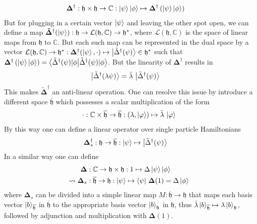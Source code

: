 \begin{align*}
    \mathbf{\Delta}^\dagger &: \mathfrak{h}\times\mathfrak{h}\to\mathbb{C}: \ket{\psi}\ket{\phi}\mapsto \mathbf{\Delta}^\dagger\left(\ket{\psi}\ket{\phi}\right)
\end{align*}
But for plugging in a certain vector $\ket{\psi}$ and leaving the other spot open, we can define a map $\mathbf{\tilde{\Delta}}^\dagger(\ket{\psi}):\mathfrak{h}\to\mathcal{L}(\mathfrak{h},\mathbb{C})\to\mathfrak{h}^*$, where $\mathcal{L}(\mathfrak{h},\mathbb{C})$ is the space of linear maps from $\mathfrak{h}$ to $\mathbb{C}$. But each such map can be represented in the dual space by a vector $\mathcal{L}(\mathfrak{h},\mathbb{C})\to \mathfrak{h}^*:\mathbf{\Delta}^\dagger(\ket{\psi},\cdot)\mapsto\ket{\tilde{\Delta}^\dagger(\psi)}\in\mathfrak{h}^*$ such that $\mathbf{\Delta}^\dagger\left(\ket{\psi}\ket{\phi}\right) = \braket{\tilde{\Delta}^\dagger(\psi)|\phi}$. But the linearity of $\mathbf{\Delta}^\dagger$ results in 
\begin{align*}
    \ket{\tilde{\Delta}^\dagger(\lambda\psi)} &= \bar{\lambda}\,\ket{\tilde{\Delta}^\dagger(\psi)}
\end{align*}
This makes $\mathbf{\tilde{\Delta}}^\dagger$ an anti-linear operation. One can resolve this issue by introduce a different space $\overline{\mathfrak{h}}$ which possesses a scalar multiplication of the form
$$\cdot: \mathbb{C}\times\overline{\mathfrak{h}}\to\overline{\mathfrak{h}}: (\lambda,\ket{\varphi})\mapsto \bar{\lambda}\,\ket{\varphi}$$
By this way one can define a linear operator over single particle Hamiltonians
\begin{align*}
    \mathbf{\Delta}_s^\dagger &: \mathfrak{h}\to\overline{\mathfrak{h}}: \ket{\psi}\mapsto \ket{\tilde{\Delta}^\dagger(\psi)}
\end{align*}
In a similar way one can define
\begin{align*}
    \mathbf{\Delta} &:\mathbb{C}\to \mathfrak{h}\times\mathfrak{h}: 1\mapsto\Delta \ket{\psi}\ket{\phi}\\
    \leadsto\mathbf{\Delta}_s &: \overline{\mathfrak{h}}\to\mathfrak{h}: \ket{\psi}\mapsto \bra{\psi}\,\mathbf{\Delta}(1)=\Delta\ket{\phi}
\end{align*}
where $\mathbf{\Delta}_s$ can be divided into a simple linear map $M:\overline{\mathfrak{h}}\to\mathfrak{h}$ that maps each basis vector $\ket{b}_{\overline{\mathfrak{h}}}$ in $\overline{\mathfrak{h}}$ to the appropriate basis vector $\ket{b}_{\mathfrak{h}}$ in $\mathfrak{h}$, thus $\bar{\lambda}\ket{b}_{\overline{\mathfrak{h}}}\mapsto{\lambda}\ket{b}_{\mathfrak{h}}$, followed by adjunction and multiplication with $\mathbf{\Delta}(1)$. 
